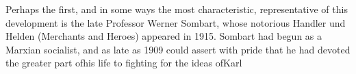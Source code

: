 \documentclass[11pt,openany]{book}
\begin{document}
\begin{center}\textasteriskcentered\hspace{0.9em}\textasteriskcentered\hspace{0.9em}\textasteriskcentered\end{center}

\begin{center}\textasteriskcentered\hspace{0.9em}\textasteriskcentered\hspace{0.9em}\textasteriskcentered\end{center}

Perhaps the first, and in some ways the most characteristic, representative of this development is the late Professor Werner Sombart, whose notorious Handler und Helden (Merchants and Heroes) appeared in 1915. Sombart had begun as a Marxian socialist, and as late as 1909 could assert with pride that he had devoted the greater part ofhis life to fighting for the ideas ofKarl
\end{document}
